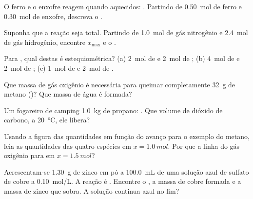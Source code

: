 \begin{exercise}[$\star$]\label{exo:g10:reaction-progress-table:3}
O ferro e o enxofre reagem quando aquecidos: .
Partindo de \qty{0.50}{mol} de ferro e \qty{0.30}{mol} de enxofre,
descreva o .
\end{exercise}

\begin{exercise}[$\star$]\label{exo:g10:reaction-progress-table:4}
Suponha que a reação  seja total. Partindo de
\qty{1.0}{mol} de gás nitrogênio e \qty{2.4}{mol} de gás hidrogênio,
encontre $x_{\max}$ e o .
\end{exercise}

\begin{exercise}[$\star$]\label{exo:g10:reaction-progress-table:5}
Para , qual destas  é estequiométrica?
(a) \qty{2}{mol} de  e \qty{2}{mol} de ; (b) \qty{4}{mol}
de  e \qty{2}{mol} de ; (c) \qty{1}{mol} de  e
\qty{2}{mol} de .
\end{exercise}

\begin{exercise}[$\star\star$]\label{exo:g10:reaction-progress-table:6}
Que massa de gás oxigênio é necessária para queimar completamente
\qty{32}{g} de metano ()? Que massa de água
é formada?
\end{exercise}

\begin{exercise}[$\star\star$]\label{exo:g10:reaction-progress-table:7}
Um fogareiro de camping  \qty{1.0}{kg} de propano:
. Que volume de dióxido de carbono, a
\qty{20}{\celsius}, ele libera?
\end{exercise}

\begin{exercise}[$\star\star$]\label{exo:g10:reaction-progress-table:8}
Usando a figura das quantidades em função do avanço para o exemplo do
metano, leia as quantidades das quatro espécies em $x = \qty{1.0}{mol}$.
Por que a linha do gás oxigênio para em $x = \qty{1.5}{mol}$?
\end{exercise}

\begin{exercise}[$\star\star$]\label{exo:g10:reaction-progress-table:9}
Acrescentam-se \qty{1.30}{g} de zinco em pó a \qty{100.0}{mL} de uma
solução azul de sulfato de cobre a \qty{0.10}{mol/L}. A reação é
.
Encontre o , a massa de cobre formada e a massa de
zinco que sobra. A solução continua azul no fim?
\end{exercise}

